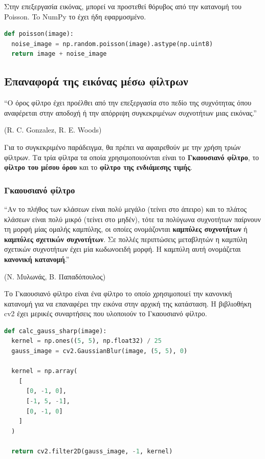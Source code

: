 Στην επεξεργασία εικόνας, μπορεί να προστεθεί θόρυβος από την κατανομή του Poisson. To NumPy το έχει ήδη εφαρμοσμένο.

\begin{lstlisting}[language=Python, caption=Poisson]
def poisson(image):
  noise_image = np.random.poisson(image).astype(np.uint8)
  return image + noise_image
\end{lstlisting}

\subsection{Επαναφορά της εικόνας μέσω φίλτρων}

\begin{problem}
  ``Ο όρος φίλτρο έχει προέλθει από την επεξεργασία στο πεδίο της συχνότητας όπου αναφέρεται στην αποδοχή ή την απόρριψη συγκεκριμένων συχνοτήτων μιας εικόνας.''

  (R. C. Gonzalez, R. E. Woods)
\end{problem}

Για το συγκεκριμένο παράδειγμα, θα πρέπει να αφαιρεθούν με την χρήση τριών φίλτρων. Τα τρία φίλτρα τα οποία χρησιμοποιούνται είναι το \textbf{Γκαουσιανό φίλτρο}, το \textbf{φίλτρο του μέσου όρου} και το \textbf{φίλτρο της ενδιάμεσης τιμής}.

\subsubsection{Γκαουσιανό φίλτρο}

\begin{problem}
  ``Αν το πλήθος των κλάσεων είναι πολύ μεγάλο (τείνει στο άπειρο) και το πλάτος κλάσεων είναι πολύ μικρό (τείνει στο μηδέν), τότε τα πολύγωνα συχνοτήτων παίρνουν τη μορφή μίας ομαλής καμπύλης, οι οποίες ονομάζονται \textbf{καμπύλες συχνοτήτων} ή \textbf{καμπύλες σχετικών συχνοτήτων}.
  Σε πολλές περιπτώσεις μεταβλητών η καμπύλη σχετικών συχνοτήτων έχει μία κωδωνοειδή μορφή. Η καμπύλη αυτή ονομάζεται \textbf{κανονική κατανομή}.''

  (Ν. Μυλωνάς, Β. Παπαδόπουλος)
\end{problem}

Το Γκαουσιανό φίλτρο είναι ένα φίλτρο το οποίο χρησιμοποιεί την κανονική κατανομή για να επαναφέρει την εικόνα στην αρχική της κατάσταση. Η βιβλιοθήκη cv2 έχει μερικές συναρτήσεις που υλοποιούν το Γκαουσιανό φίλτρο.

\begin{lstlisting}[language=Python, caption=Gauss Sharp]
def calc_gauss_sharp(image):
  kernel = np.ones((5, 5), np.float32) / 25
  gauss_image = cv2.GaussianBlur(image, (5, 5), 0)

  kernel = np.array(
    [
      [0, -1, 0],
      [-1, 5, -1],
      [0, -1, 0]
    ]
  )

  return cv2.filter2D(gauss_image, -1, kernel)
\end{lstlisting}

